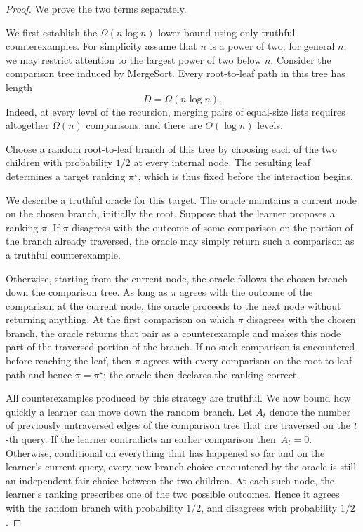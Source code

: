 \documentclass[11pt]{article}
\theoremstyle{definition}
\theoremstyle{remark}
\begin{document}
\begin{proof}
We prove the two terms separately.

We first establish the $\Omega(n\log n)$ lower bound using only truthful
counterexamples. For simplicity assume that $n$ is a power of two; for
general $n$, we may restrict attention to the largest power of two below
$n$. Consider the comparison tree induced by MergeSort. Every
root-to-leaf path in this tree has length
\[
    D=\Omega(n\log n).
\]
Indeed, at every level of the recursion, merging pairs of equal-size lists
requires altogether $\Omega(n)$ comparisons, and there are
$\Theta(\log n)$ levels.

Choose a random root-to-leaf branch of this tree by choosing each of the two
children with probability $1/2$ at every internal node. The resulting leaf
determines a target ranking $\pi^\star$, which is thus fixed before the
interaction begins.

We describe a truthful oracle for this target. The oracle maintains a
current node on the chosen branch, initially the root. Suppose that the
learner proposes a ranking $\pi$. If $\pi$ disagrees with the outcome of
some comparison on the portion of the branch already traversed, the oracle
may simply return such a comparison as a truthful counterexample.

Otherwise, starting from the current node, the oracle follows the chosen
branch down the comparison tree. As long as $\pi$ agrees with the outcome
of the comparison at the current node, the oracle proceeds to the next
node without returning anything. At the first comparison on which $\pi$
disagrees with the chosen branch, the oracle returns that pair as a
counterexample and makes this node part of the traversed portion of the
branch. If no such comparison is encountered before reaching the leaf,
then $\pi$ agrees with every comparison on the root-to-leaf path and hence
$\pi=\pi^\star$; the oracle then declares the ranking correct.

All counterexamples produced by this strategy are truthful. We now bound
how quickly a learner can move down the random branch. Let $A_t$ denote the
number of previously untraversed edges of the comparison tree that are traversed on
the $t$-th query. If the learner contradicts an earlier comparison then~$A_t=0$. Otherwise, conditional on everything that has happened so far and
on the learner's current query, every new branch choice encountered by the
oracle is still an independent fair choice between the two children. At
each such node, the learner's ranking prescribes one of the two possible
outcomes. Hence it agrees with the random branch with probability $1/2$,
and disagrees with probability $1/2$.


\end{proof}
\end{document}
